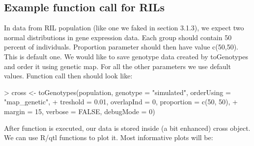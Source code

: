 \documentclass{article}
\begin{document}
\subsection{Example function call for RILs}
In data from RIL population (like one we faked in section 3.1.3), we expect two normal distributions in gene expression data. Each group should contain 50 percent of individuals. Proportion parameter should then have value c(50,50).
This is default one. We would like to save genotype data created by toGenotypes and order it using genetic map. For all the other parameters we use default values.  Function call then should look like:
\begin{Schunk}
\begin{Sinput}
> cross <- toGenotypes(population, genotype = "simulated", orderUsing = "map_genetic", 
+     treshold = 0.01, overlapInd = 0, proportion = c(50, 50), 
+     margin = 15, verbose = FALSE, debugMode = 0)
\end{Sinput}
\end{Schunk}

{\noindent}After function is executed, our data is stored inside (a bit enhanced) cross object. We can use R/qtl functions to plot it. Most informative plots will be:
\end{document}
